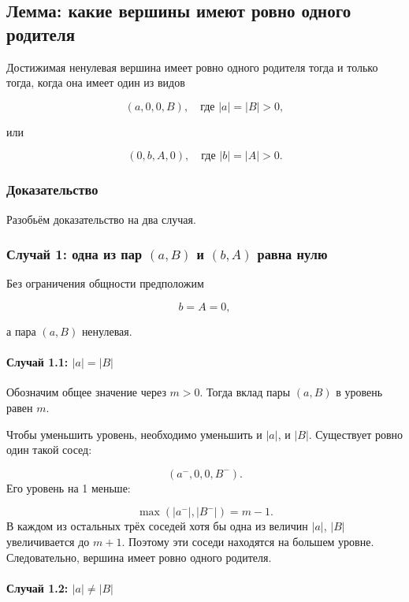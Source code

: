 \subsection{Лемма: какие вершины имеют ровно одного родителя}

Достижимая ненулевая вершина имеет ровно одного родителя тогда и только
тогда, когда она имеет один из видов

$$
(a,0,0,B),\quad \text{где }|a|=|B|>0,
$$

или

$$
(0,b,A,0),\quad \text{где }|b|=|A|>0.
$$

\subsubsection{Доказательство}

Разобьём доказательство на два случая.

\subsubsection{\texorpdfstring{Случай 1: одна из пар $(a,B)$ и $(b,A)$ равна нулю}{Случай 1: одна из пар (a,B) и (b,A) равна нулю}}

Без ограничения общности предположим

$$
b=A=0,
$$

а пара $(a,B)$ ненулевая.

\paragraph{\texorpdfstring{Случай 1.1: $|a|=|B|$}{Случай 1.1: \textbar a\textbar=\textbar B\textbar{}}}

Обозначим общее значение через $m>0$. Тогда вклад пары $(a,B)$ в уровень
равен $m$.

Чтобы уменьшить уровень, необходимо уменьшить и $|a|$, и $|B|$.
Существует ровно один такой сосед:

$$(a^{-},0,0,B^{-}).
$$
Его уровень на 1 меньше:

$$\max(|a^{-}|,|B^{-}|)=m-1.
$$
В каждом из остальных трёх соседей хотя бы одна из величин $|a|$, $|B|$
увеличивается до $m+1$. Поэтому эти соседи находятся на большем уровне.
Следовательно, вершина имеет ровно одного родителя.

\paragraph{\texorpdfstring{Случай 1.2: $|a| \ne |B|$}{Случай 1.2: \textbar a\textbar{} != \textbar B\textbar{}}}

